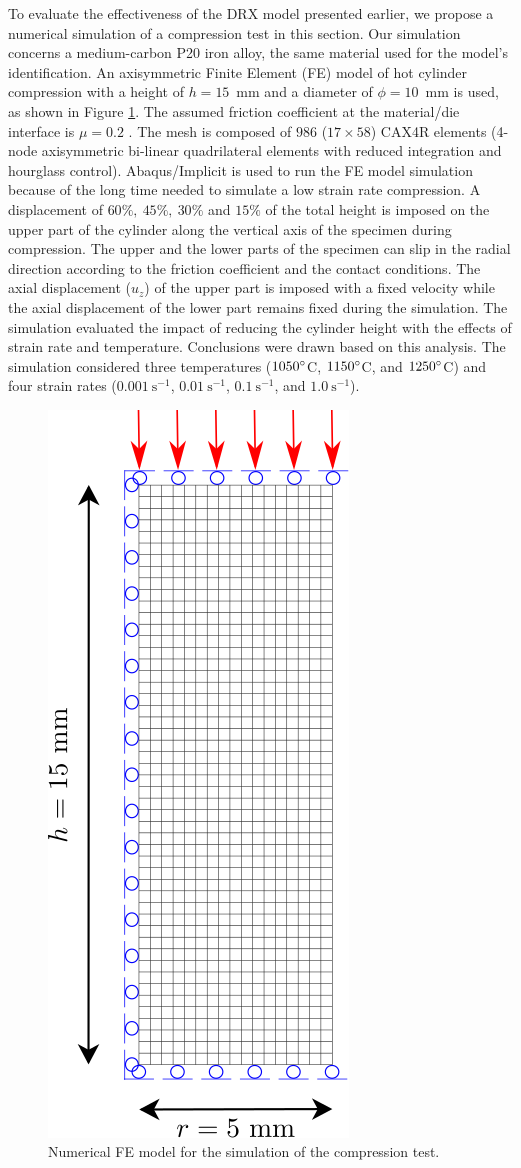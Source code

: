 \documentclass[metals,article,submit,pdftex,moreauthors]{Definitions/mdpi}
\DeclareRobustCommand{\ps}{\text{s}^{-1}}
\begin{document}
To evaluate the effectiveness of the DRX model presented earlier, we propose a numerical simulation of a compression test in this section.
Our simulation concerns a medium-carbon P20 iron alloy, the same material used for the model's identification.
An axisymmetric Finite Element (FE) model of hot cylinder compression with a height of $h=15$~mm and a diameter of $\phi=10$~mm is used, as shown in Figure \ref{fig:Mesh}.
The assumed friction coefficient at the material/die interface is $\mu=0.2$ \cite{Zhang-2019,Sun-2020}.
The mesh is composed of $986$ ($17\times58$) CAX4R elements (4-node axisymmetric bi-linear quadrilateral elements with reduced integration and hourglass control).
Abaqus/Implicit is used to run the FE model simulation because of the long time needed to simulate a low strain rate compression.
A displacement of $60\%, ~45\%, ~30\%$ and $15\%$ of the total height is imposed on the upper part of the cylinder along the vertical axis of the specimen during compression.
The upper and the lower parts of the specimen can slip in the radial direction according to the friction coefficient and the contact conditions.
The axial displacement ($u_z$) of the upper part is imposed with a fixed velocity while the axial displacement of the lower part remains fixed during the simulation.
The simulation evaluated the impact of reducing the cylinder height with the effects of strain rate and temperature.
Conclusions were drawn based on this analysis.
The simulation considered three temperatures ($1050\degree$C, $1150\degree$C, and $1250\degree$C) and four strain rates ($0.001~\ps$, $0.01~\ps$, $0.1~\ps$, and $1.0~\ps$).
\begin{figure}[H]
\centering
\includegraphics[height=0.7\columnwidth]{Figures/CyCompression2}
\caption{Numerical FE model for the simulation of the compression test.}
\label{fig:Mesh}
\end{figure}
\end{document}
